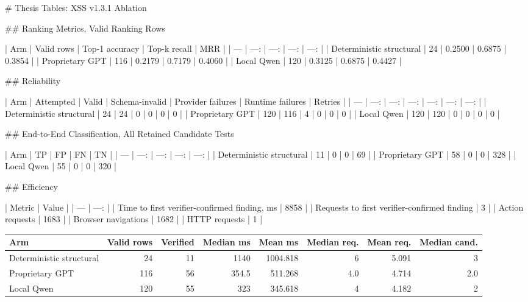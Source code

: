 # Thesis Tables: XSS v1.3.1 Ablation

## Ranking Metrics, Valid Ranking Rows

| Arm | Valid rows | Top-1 accuracy | Top-k recall | MRR |
| --- | ---: | ---: | ---: | ---: |
| Deterministic structural | 24 | 0.2500 | 0.6875 | 0.3854 |
| Proprietary GPT | 116 | 0.2179 | 0.7179 | 0.4060 |
| Local Qwen | 120 | 0.3125 | 0.6875 | 0.4427 |

## Reliability

| Arm | Attempted | Valid | Schema-invalid | Provider failures | Runtime failures | Retries |
| --- | ---: | ---: | ---: | ---: | ---: | ---: |
| Deterministic structural | 24 | 24 | 0 | 0 | 0 | 0 |
| Proprietary GPT | 120 | 116 | 4 | 0 | 0 | 0 |
| Local Qwen | 120 | 120 | 0 | 0 | 0 | 0 |

## End-to-End Classification, All Retained Candidate Tests

| Arm | TP | FP | FN | TN |
| --- | ---: | ---: | ---: | ---: |
| Deterministic structural | 11 | 0 | 0 | 69 |
| Proprietary GPT | 58 | 0 | 0 | 328 |
| Local Qwen | 55 | 0 | 0 | 320 |

## Efficiency

| Metric | Value |
| --- | ---: |
| Time to first verifier-confirmed finding, ms | 8858 |
| Requests to first verifier-confirmed finding | 3 |
| Action requests | 1683 |
| Browser navigations | 1682 |
| HTTP requests | 1 |

\begin{tabular}{lrrrrrrr}
\hline
Arm & Valid rows & Verified & Median ms & Mean ms & Median req. & Mean req. & Median cand. \\
\hline
Deterministic structural & 24 & 11 & 1140 & 1004.818 & 6 & 5.091 & 3 \\
Proprietary GPT & 116 & 56 & 354.5 & 511.268 & 4.0 & 4.714 & 2.0 \\
Local Qwen & 120 & 55 & 323 & 345.618 & 4 & 4.182 & 2 \\
\hline
\end{tabular}

